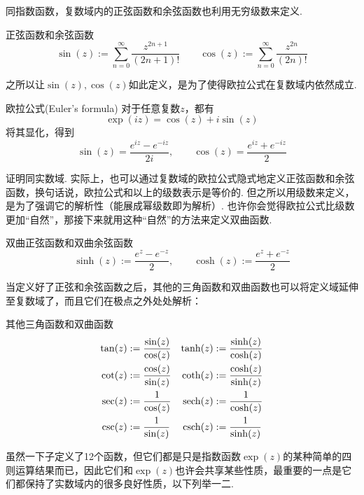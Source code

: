 \documentclass[main.tex]{subfiles}
\begin{document}
同指数函数，复数域内的正弦函数和余弦函数也利用无穷级数来定义.

\begin{definition}{正弦函数和余弦函数}
    \[\sin(z) := \sum_{n=0}^{\infty}\frac{z^{2n+1}}{(2n+1)!} \qquad \cos(z) := \sum_{n=0}^{\infty}\frac{z^{2n}}{(2n)!} \]
\end{definition}

之所以让\(\sin(z),\cos(z)\)如此定义，是为了使得欧拉公式在复数域内依然成立.

\begin{theorem}{欧拉公式(Euler's formula)}
    对于任意复数\(z\)，都有
    \[\exp(iz)=\cos(z)+i\sin(z)\]
    将其显化，得到
    \[\sin(z) = \frac{e^{iz}-e^{-iz}}{2i}, \qquad \cos(z) = \frac{e^{iz}+e^{-iz}}{2}\]
\end{theorem}
证明同实数域. 实际上，也可以通过复数域的欧拉公式隐式地定义正弦函数和余弦函数，换句话说，欧拉公式和以上的级数表示是等价的. 但之所以用级数来定义，是为了强调它的解析性（能展成幂级数即为解析）. 也许你会觉得欧拉公式比级数更加“自然”，那接下来就用这种“自然”的方法来定义双曲函数.

\begin{definition}{双曲正弦函数和双曲余弦函数}
    \[\sinh(z) := \frac{e^z-e^{-z}}{2}, \qquad \cosh(z) := \frac{e^z+e^{-z}}{2}\]
\end{definition}

当定义好了正弦和余弦函数之后，其他的三角函数和双曲函数也可以将定义域延伸至复数域了，而且它们在极点之外处处解析：
\begin{definition}{其他三角函数和双曲函数}
    \[
    \begin{aligned}
        \tan(z) &:= \frac{\sin(z)}{\cos(z)} &  \tanh(z) &:= \frac{\sinh(z)}{\cosh(z)}\\
        \cot(z) &:= \frac{\cos(z)}{\sin(z)} & \coth(z) &:= \frac{\cosh(z)}{\sinh(z)} \\
        \sec(z) &:= \frac{1}{\cos(z)} & {\rm sech}(z) &:= \frac{1}{\cosh(z)} \\
        \csc(z) &:= \frac{1}{\sin(z)} & {\rm csch}(z) &:= \frac{1}{\sinh(z)}
    \end{aligned}
    \]  
\end{definition}

虽然一下子定义了12个函数，但它们都是只是指数函数\(\exp(z)\)的某种简单的四则运算结果而已，因此它们和\(\exp(z)\)也许会共享某些性质，最重要的一点是它们都保持了实数域内的很多良好性质，以下列举一二.
\end{document}
